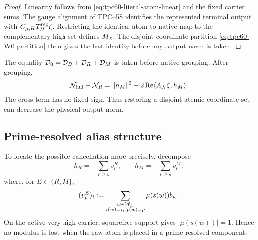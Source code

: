 \begin{proof}
Linearity follows from \eqref{eq:tpc60-literal-atom-linear} and the fixed
carrier sums.  The gauge alignment of TPC--58 identifies the represented
terminal output with \(C_{\mu,H}T_H^{\rm rep}\zeta\).  Restricting the
identical atom-to-native map to the complementary high set defines \(M_X\).
The disjoint coordinate partition \eqref{eq:tpc60-W0-partition} then gives
the last identity before any output norm is taken.
\end{proof}

\begin{remark}
The equality \(\mathcal D_0=\mathcal D_B+\mathcal D_R+\mathcal D_M\) is taken before native grouping.
After grouping,
\[
 \mathcal N_{\rm full}-\mathcal N_R
 =\|h_M\|^2+2\operatorname{Re}\langle A_X\zeta,h_M\rangle.
\]
The cross term has no fixed sign.  Thus restoring a disjoint atomic
coordinate set can decrease the physical output norm.
\end{remark}

\subsection{Prime-resolved alias structure}

To locate the possible cancellation more precisely, decompose
\begin{equation}
 h_R=-\sum_{p>y}v_p^R,
 \qquad
 h_M=-\sum_{p>y}v_p^M,
 \label{eq:tpc60-prime-decompositions}
\end{equation}
where, for \(E\in\{R,M\}\),
\begin{equation}
 (v_p^E)_i
 :=\sum_{\substack{w\in\mathcal W_E\\i(w)=i,\ p(w)=p}}
       \mu(s(w))b_w.
 \label{eq:tpc60-prime-vector-components}
\end{equation}
On the active very-high carrier, squarefree support gives
\(|\mu(s(w))|=1\).  Hence no modulus is lost when the raw atom is placed in
a prime-resolved component.

